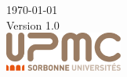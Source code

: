\begin{titlepage}
\vfill



{\large \today}\\[3mm] %
{\large Version 1.0}\\[1.5cm] 


\includegraphics[height=13mm]{../images/logo.png} %



\end{titlepage}